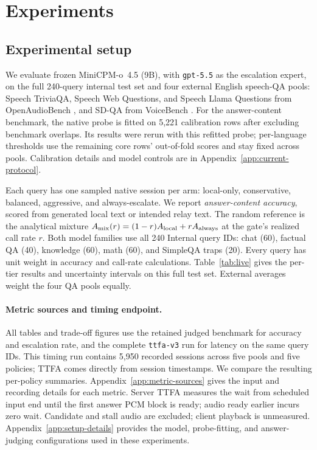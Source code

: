\section{Experiments}
\label{sec:setup}
\label{sec:results}
\subsection{Experimental setup}
\label{sec:models}
\label{sec:dataset}
\label{sec:signals}
\label{sec:evalproto}
\label{sec:liveproto}
\label{sec:inject}
We evaluate frozen MiniCPM-o~4.5 (9B), with \texttt{gpt-5.5} as the
escalation expert, on the full 240-query internal test set and four
external English speech-QA pools: Speech TriviaQA, Speech Web Questions,
and Speech Llama Questions from OpenAudioBench \citep{li2025baichuanaudio},
and SD-QA from VoiceBench \citep{faisal2021sdqa,chen2024voicebench}.
For the answer-content benchmark, the native probe is fitted on 5,221
calibration rows after excluding benchmark overlaps. Its results were rerun
with this refitted probe; per-language thresholds use the remaining
core rows' out-of-fold scores and stay fixed across pools.
Calibration details and model controls are in
Appendix~\ref{app:current-protocol}.

Each query has one sampled native session per arm: local-only,
conservative, balanced, aggressive, and always-escalate.
We report \emph{answer-content accuracy}, scored from generated local
text or intended relay text. The random reference is the analytical
mixture $A_{\rm mix}(r)=(1-r)A_{\rm local}+rA_{\rm always}$ at the
gate's realized call rate $r$. Both model families use all 240
Internal query IDs: chat (60), factual QA (40), knowledge (60), math (60),
and SimpleQA traps (20). Every query has unit weight in accuracy and
call-rate calculations. Table~\ref{tab:live} gives the per-tier results
and uncertainty intervals on this full test set.
External averages weight the four QA pools equally.
\paragraph{Metric sources and timing endpoint.}
All tables and trade-off figures use the retained judged benchmark for
accuracy and escalation rate, and the complete \texttt{ttfa-v3} run
for latency on the same query IDs. This timing run contains 5,950
recorded sessions across five pools and five policies; TTFA comes
directly from session timestamps. We compare the resulting per-policy
summaries. Appendix~\ref{app:metric-sources} gives the input and recording
details for each metric. Server TTFA measures the wait
from scheduled input end until the first answer PCM block is ready;
audio ready earlier incurs zero wait. Candidate and stall audio are excluded;
client playback is unmeasured.
Appendix~\ref{app:setup-details} provides the model, probe-fitting,
and answer-judging configurations used in these experiments.

